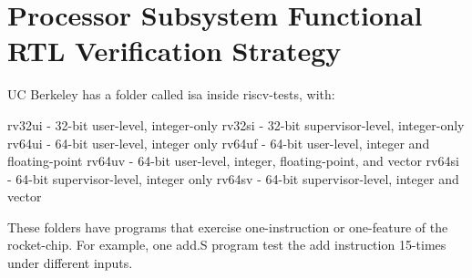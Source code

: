 
\section{Processor Subsystem Functional RTL Verification Strategy}


UC Berkeley has a folder called isa inside riscv-tests, with:

rv32ui - 32-bit user-level, integer-only
rv32si - 32-bit supervisor-level, integer-only
rv64ui - 64-bit user-level, integer only
rv64uf - 64-bit user-level, integer and floating-point
rv64uv - 64-bit user-level, integer, floating-point, and vector
rv64si - 64-bit supervisor-level, integer only
rv64sv - 64-bit supervisor-level, integer and vector

These folders have programs that exercise one-instruction or one-feature of
the rocket-chip. For example, one add.S program test the add instruction
15-times under different inputs.

